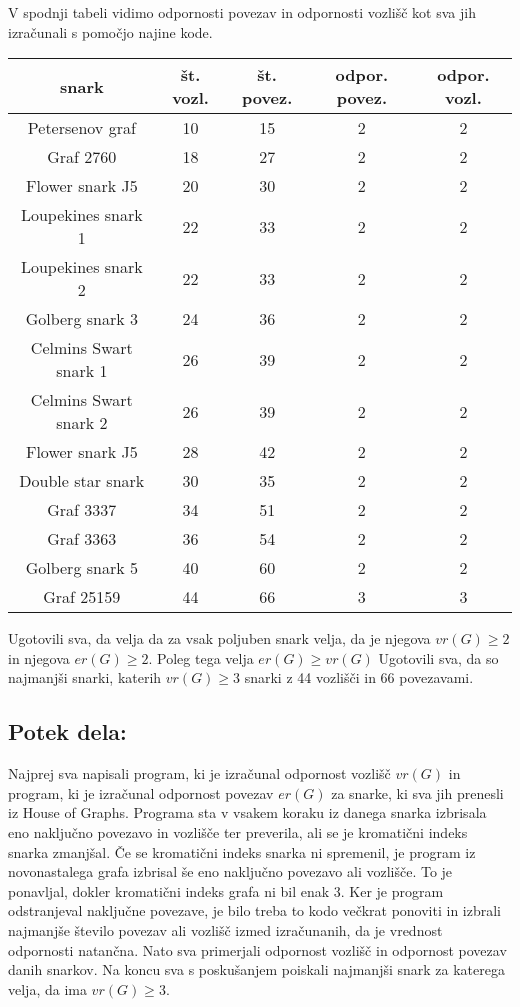 \documentclass[a4paper, 10pt]{article}
\begin{document}
V spodnji tabeli vidimo odpornosti povezav in odpornosti vozlišč kot sva
jih izračunali s pomočjo najine kode.

\begin{center}
    \begin{tabular}{|c|c|c|c|c|}
        \hline
        snark & št. vozl. & št. povez. & odpor. povez. & odpor. vozl. \\
        \hline
        Petersenov graf & 10 & 15 & 2 & 2 \\ 
        \hline
        Graf 2760 & 18 & 27 & 2 & 2 \\
        \hline
        Flower snark J5 & 20 & 30 & 2 & 2 \\
        \hline
        Loupekines snark 1 & 22 & 33 & 2 & 2 \\
        \hline
        Loupekines snark 2 & 22 & 33 & 2 & 2 \\ 
        \hline
        Golberg snark 3 & 24 & 36 & 2 & 2 \\
        \hline
        Celmins Swart snark 1 & 26 & 39 & 2 & 2\\
        \hline 
        Celmins Swart snark 2 & 26 & 39 & 2 & 2\\
        \hline
        Flower snark J5 & 28 & 42 & 2 & 2 \\
        \hline
        Double star snark & 30 & 35 & 2 & 2 \\
        \hline
        Graf 3337 & 34 & 51 & 2 & 2 \\
        \hline
        Graf 3363 & 36 & 54 & 2 & 2 \\
        \hline
        Golberg snark 5 & 40 & 60 & 2 & 2 \\
        \hline
        Graf 25159 & 44 & 66 & 3 & 3 \\
        \hline
    \end{tabular}
    \end{center}

Ugotovili sva, da velja da za vsak poljuben snark velja, da je njegova $vr(G) \ge 2$ in
njegova $er(G) \ge 2$. Poleg tega velja $er(G) \ge vr(G) $ Ugotovili sva, da so najmanjši
snarki, katerih $vr(G) \ge 3$ snarki z 44 vozlišči in 66 povezavami.




\pagebreak
\subsection*{Potek dela:}
Najprej sva napisali program, ki je izračunal odpornost vozlišč $vr(G)$ in program, ki je 
izračunal odpornost povezav $er(G)$ za snarke, ki sva jih prenesli iz House of Graphs.
Programa sta v vsakem koraku iz danega snarka izbrisala eno naključno povezavo in vozlišče ter
preverila, ali se je kromatični indeks snarka zmanjšal. Če se kromatični indeks snarka ni 
spremenil, je program iz novonastalega grafa izbrisal še eno naključno povezavo ali vozlišče. To je 
ponavljal, dokler kromatični indeks grafa ni bil enak 3. Ker je program odstranjeval naključne
povezave, je bilo treba to kodo večkrat ponoviti in izbrali najmanjše število povezav ali vozlišč izmed
izračunanih, da je vrednost odpornosti natančna. 
Nato sva primerjali odpornost vozlišč in odpornost povezav danih snarkov. Na koncu sva s poskušanjem 
poiskali najmanjši snark za katerega velja, da ima $vr(G) \ge 3$.
\end{document}
